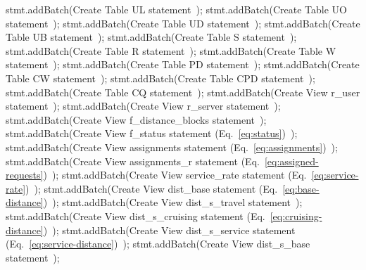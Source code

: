 \documentclass{article}
\theoremstyle{definition}                   %
\begin{document}
    stmt.addBatch(\LA{}Create Table UL statement~{\nwtagstyle{}}\RA{});
    stmt.addBatch(\LA{}Create Table UO statement~{\nwtagstyle{}}\RA{});
    stmt.addBatch(\LA{}Create Table UD statement~{\nwtagstyle{}}\RA{});
    stmt.addBatch(\LA{}Create Table UB statement~{\nwtagstyle{}}\RA{});
    stmt.addBatch(\LA{}Create Table S statement~{\nwtagstyle{}}\RA{});
    stmt.addBatch(\LA{}Create Table R statement~{\nwtagstyle{}}\RA{});
    stmt.addBatch(\LA{}Create Table W statement~{\nwtagstyle{}}\RA{});
    stmt.addBatch(\LA{}Create Table PD statement~{\nwtagstyle{}}\RA{});
    stmt.addBatch(\LA{}Create Table CW statement~{\nwtagstyle{}}\RA{});
    stmt.addBatch(\LA{}Create Table CPD statement~{\nwtagstyle{}}\RA{});
    stmt.addBatch(\LA{}Create Table CQ statement~{\nwtagstyle{}}\RA{});
    stmt.addBatch(\LA{}Create View r\_user statement~{\nwtagstyle{}}\RA{});
    stmt.addBatch(\LA{}Create View r\_server statement~{\nwtagstyle{}}\RA{});
    stmt.addBatch(\LA{}Create View f\_distance\_blocks statement~{\nwtagstyle{}}\RA{});
    stmt.addBatch(\LA{}Create View f\_status statement (Eq.~\ref{eq:status})~{\nwtagstyle{}}\RA{});
    stmt.addBatch(\LA{}Create View assignments statement (Eq.~\ref{eq:assignments})~{\nwtagstyle{}}\RA{});
    stmt.addBatch(\LA{}Create View assignments\_r statement (Eq.~\ref{eq:assigned-requests})~{\nwtagstyle{}}\RA{});
    stmt.addBatch(\LA{}Create View service\_rate statement (Eq.~\ref{eq:service-rate})~{\nwtagstyle{}}\RA{});
    stmt.addBatch(\LA{}Create View dist\_base statement (Eq.~\ref{eq:base-distance})~{\nwtagstyle{}}\RA{});
    stmt.addBatch(\LA{}Create View dist\_s\_travel statement~{\nwtagstyle{}}\RA{});
    stmt.addBatch(\LA{}Create View dist\_s\_cruising statement (Eq.~\ref{eq:cruising-distance})~{\nwtagstyle{}}\RA{});
    stmt.addBatch(\LA{}Create View dist\_s\_service statement (Eq.~\ref{eq:service-distance})~{\nwtagstyle{}}\RA{});
    stmt.addBatch(\LA{}Create View dist\_s\_base statement~{\nwtagstyle{}}\RA{});
\end{document}
